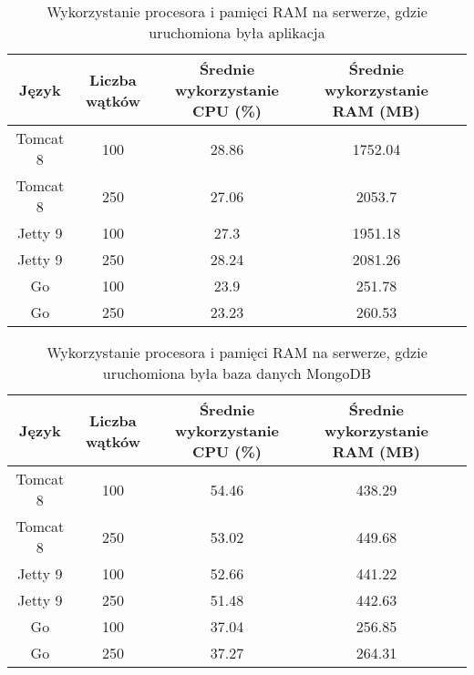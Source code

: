 
\begin{table}[!htb]
\centering
\caption{Wykorzystanie procesora i pamięci RAM na serwerze, gdzie uruchomiona była aplikacja}
\label{tab:app-full-crud}
\begin{tabular}{@{}ccccl@{}}
\toprule
\textbf{Język} & \textbf{Liczba wątków} & \multicolumn{1}{p{3cm}}{\textbf{Średnie wykorzystanie CPU (\%)}} & \multicolumn{1}{p{3cm}}{\textbf{Średnie wykorzystanie RAM (MB)}} &  \\ \midrule
Tomcat 8       & 100                    & 28.86                             & 1752.04                          &  \\
Tomcat 8       & 250                    & 27.06                             & 2053.7                          &  \\
Jetty 9       & 100                    & 27.3                             & 1951.18                          &  \\
Jetty 9       & 250                    & 28.24                             & 2081.26                          &  \\
Go       & 100                    & 23.9                             & 251.78                          &  \\
Go       & 250                    & 23.23                             & 260.53                          &  \\
\bottomrule
\end{tabular}
\end{table}


\begin{table}[!htb]
\centering
\caption{Wykorzystanie procesora i pamięci RAM na serwerze, gdzie uruchomiona była baza danych MongoDB}
\label{tab:mongo-full-crud}
\begin{tabular}{@{}ccccl@{}}
\toprule
\textbf{Język} & \textbf{Liczba wątków} & \multicolumn{1}{p{3cm}}{\textbf{Średnie wykorzystanie CPU (\%)}} & \multicolumn{1}{p{3cm}}{\textbf{Średnie wykorzystanie RAM (MB)}} &  \\ \midrule
Tomcat 8       & 100                    & 54.46                             & 438.29                          &  \\
Tomcat 8       & 250                    & 53.02                             & 449.68                          &  \\
Jetty 9       & 100                    & 52.66                             & 441.22                          &  \\
Jetty 9       & 250                    & 51.48                             & 442.63                          &  \\
Go       & 100                    & 37.04                             & 256.85                          &  \\
Go       & 250                    & 37.27                             & 264.31                          &  \\
\bottomrule
\end{tabular}
\end{table}

